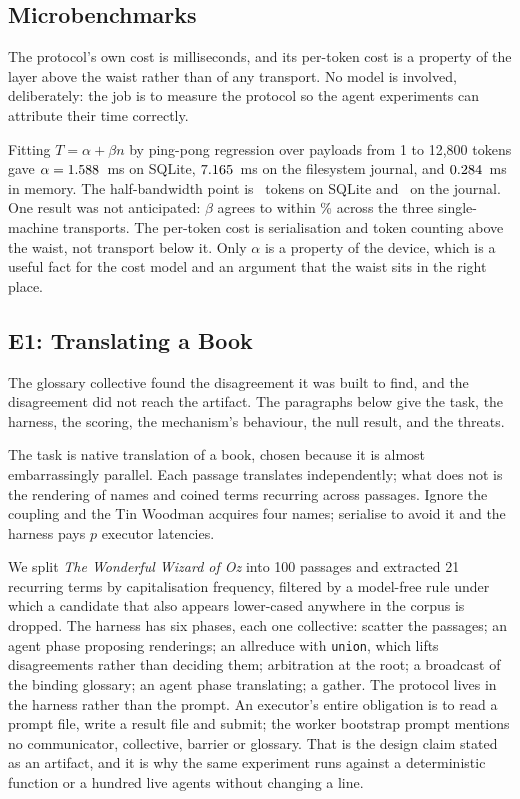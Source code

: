 \documentclass[sigconf,nonacm]{acmart}
\newcommand{\code}[1]{\texttt{\small #1}}
\begin{document}
\subsection{Microbenchmarks}
\label{sec:eval-micro}

The protocol's own cost is milliseconds, and its per-token cost is a property of
the layer above the waist rather than of any transport. No model is involved,
deliberately: the job is to measure the protocol so the agent experiments can
attribute their time correctly.

Fitting $T = \alpha + \beta n$ by ping-pong regression over payloads from 1 to
12{,}800 tokens gave $\alpha = 1.588$~ms on SQLite, $7.165$~ms on
the filesystem journal, and $0.284$~ms in memory. The half-bandwidth point
is \nHalfSqlite\ tokens on SQLite and \nHalfJournal\ on the journal. One result
was not anticipated: $\beta$ agrees to within \betaSpread\% across the three
single-machine transports. The per-token cost is serialisation and token counting
above the waist, not transport below it. Only $\alpha$ is a property of the
device, which is a useful fact for the cost model and an argument that the waist
sits in the right place.

\subsection{E1: Translating a Book}
\label{sec:eval-e1}

The glossary collective found the disagreement it was built to find, and the
disagreement did not reach the artifact. The paragraphs below give the task, the
harness, the scoring, the mechanism's behaviour, the null result, and the
threats.

The task is native translation of a book, chosen because it is almost
embarrassingly parallel. Each passage translates independently; what does not is
the rendering of names and coined terms recurring across passages. Ignore the
coupling and the Tin Woodman acquires four names; serialise to avoid it and the
harness pays $p$ executor latencies.

We split \emph{The Wonderful Wizard of Oz} into 100 passages and extracted 21
recurring terms by capitalisation frequency, filtered by a model-free rule under
which a candidate that also appears lower-cased anywhere in the corpus is
dropped. The harness has six phases, each one collective: scatter the passages;
an agent phase proposing renderings; an allreduce with \code{union}, which lifts
disagreements rather than deciding them; arbitration at the root; a broadcast of
the binding glossary; an agent phase translating; a gather. The protocol lives
in the harness rather than the prompt. An executor's entire obligation is to
read a prompt file, write a result file and submit; the worker bootstrap prompt
mentions no communicator, collective, barrier or glossary. That is the design
claim stated as an artifact, and it is why the same experiment runs against a
deterministic function or a hundred live agents without changing a line.
\end{document}
